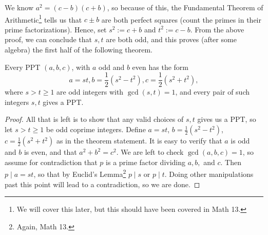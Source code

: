 \documentclass{article}
\begin{document}
We know $a^2 = (c-b)(c+b)$, so because of this, the Fundamental Theorem of Arithmetic\footnote{We will cover this later, but this should have been covered in Math 13.} tells us that $c\pm b$ are both perfect squares (count the primes in their prime factorizations). Hence, set $s^2 := c+b$ and $t^2 := c-b$. From the above proof, we can conclude that $s,t$ are both odd, and this proves (after some algebra) the first half of the following theorem.
\begin{theorem}
Every PPT $(a,b,c)$, with $a$ odd and $b$ even has the form
$$a = st, b = \frac 12(s^2 - t^2), c = \frac 12(s^2 + t^2),$$
where $s > t \geq 1$ are odd integers with $\gcd(s,t) = 1$, and every pair of such integers $s,t$ gives a PPT.
\end{theorem}
\begin{proof}
All that is left is to show that any valid choices of $s,t$ gives us a PPT, so let $s > t\geq 1$ be odd coprime integers. Define $a = st$, $b = \frac 12(s^2-t^2)$, $c = \frac 12(s^2 + t^2)$ as in the theorem statement. It is easy to verify that $a$ is odd and $b$ is even, and that $a^2 + b^2 = c^2$. We are left to check $\gcd(a,b,c) = 1$, so assume for contradiction that $p$ is a prime factor dividing $a,b,$ and $c$. Then $p\mid a = st$, so that by Euclid's Lemma\footnote{Again, Math 13.} $p\mid s$ or $p\mid t$. Doing other manipulations past this point will lead to a contradiction, so we are done.
\end{proof}

\setcounter{section}{17}
\end{document}
